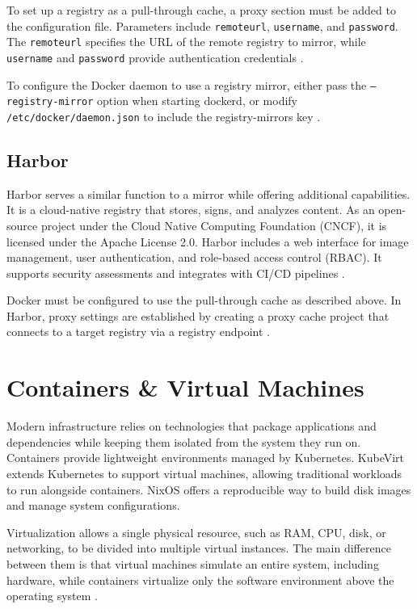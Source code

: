 To set up a registry as a pull-through cache, a proxy section must be added to the configuration file. Parameters include \texttt{remoteurl}, \texttt{username}, and \texttt{password}. The \texttt{remoteurl} specifies the URL of the remote registry to mirror, while \texttt{username} and \texttt{password} provide authentication credentials \Parencite{dockerhubmirror}.

To configure the Docker daemon to use a registry mirror, either pass the \texttt{--registry-mirror} option when starting dockerd, or modify \texttt{/etc/docker/\allowbreak daemon.json} to include the registry-mirrors key \Parencite{dockerhubmirror}.

\subsection{Harbor}
Harbor serves a similar function to a mirror while offering additional capabilities. It is a cloud-native registry that stores, signs, and analyzes content. As an open-source project under the Cloud Native Computing Foundation (CNCF), it is licensed under the Apache License 2.0. Harbor includes a web interface for image management, user authentication, and role-based access control (RBAC). It supports security assessments and integrates with CI/CD pipelines \Parencite{harbor}.

Docker must be configured to use the pull-through cache as described above. In Harbor, proxy settings are established by creating a proxy cache project that connects to a target registry via a registry endpoint \Parencite{harbor}.

\section{Containers \& Virtual Machines} \label{sec:vm_vs_container}
Modern infrastructure relies on technologies that package applications and dependencies while keeping them isolated from the system they run on. Containers provide lightweight environments managed by Kubernetes. KubeVirt extends Kubernetes to support virtual machines, allowing traditional workloads to run alongside containers. NixOS offers a reproducible way to build disk images and manage system configurations.

Virtualization allows a single physical resource, such as RAM, CPU, disk, or networking, to be divided into multiple virtual instances. The main difference between them is that virtual machines simulate an entire system, including hardware, while containers virtualize only the software environment above the operating system \Parencite{atlassian_containers_vs_vms}.

